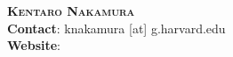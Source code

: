 \documentclass[letterpaper,11pt]{article} %
\begin{document}

\begin{minipage}[c]{1.0\textwidth}
\centering
    \textbf{\LARGE \scshape{Kentaro Nakamura}} \\ 
    \vspace{5pt}
    \small{\textbf{Contact}: knakamura [at] g.harvard.edu} \\ \vspace{1pt}
   \small{\textbf{Website}: }
\end{minipage}

\vspace{-5pt}
\end{document}
